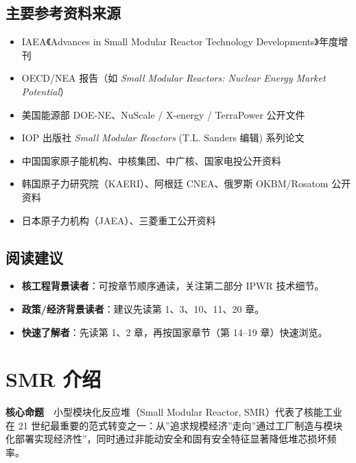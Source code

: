 \documentclass[
  UTF8,
  scheme=plain,
  fontsize=10pt,
  openany
]{ctexbook}
\begin{document}
\section*{主要参考资料来源}\label{ux4e3bux8981ux53c2ux8003ux8d44ux6599ux6765ux6e90}

\begin{itemize}
\tightlist
\item
  IAEA《Advances in Small Modular Reactor Technology
  Developments》年度增刊
\item
  OECD/NEA 报告（如 \emph{Small Modular Reactors: Nuclear Energy Market
  Potential}）
\item
  美国能源部 DOE-NE、NuScale / X-energy / TerraPower 公开文件
\item
  IOP 出版社 \emph{Small Modular Reactors} (T.L. Sanders 编辑) 系列论文
\item
  中国国家原子能机构、中核集团、中广核、国家电投公开资料
\item
  韩国原子力研究院（KAERI）、阿根廷 CNEA、俄罗斯 OKBM/Rosatom 公开资料
\item
  日本原子力机构（JAEA）、三菱重工公开资料
\end{itemize}

\section*{阅读建议}\label{ux9605ux8bfbux5efaux8bae}

\begin{itemize}
\tightlist
\item
  \textbf{核工程背景读者}：可按章节顺序通读，关注第二部分 IPWR
  技术细节。
\item
  \textbf{政策/经济背景读者}：建议先读第 1、3、10、11、20 章。
\item
  \textbf{快速了解者}：先读第 1、2 章，再按国家章节（第 14--19
  章）快速浏览。
\end{itemize}

\cleardoublepage

\chapter{SMR 介绍}\label{smr-ux4ecbux7ecd}

\begin{epigraph}

\textbf{核心命题}　小型模块化反应堆（Small Modular Reactor,
SMR）代表了核能工业在 21
世纪最重要的范式转变之一：从''追求规模经济''走向''通过工厂制造与模块化部署实现经济性''，同时通过非能动安全和固有安全特征显著降低堆芯损坏频率。

\end{epigraph}
\end{document}
